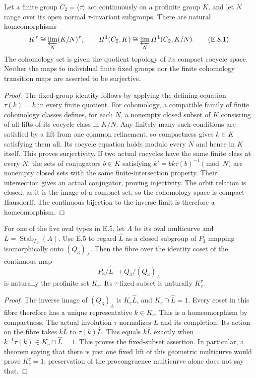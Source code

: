 Let a finite group $C_2=\langle\tau\rangle$ act continuously
on a profinite group $K$, and let $N$ range over its open
normal $\tau$-invariant subgroups.  There are natural
homeomorphisms
\[
 K^\tau\cong\varprojlim_N(K/N)^\tau,
 \qquad
 H^1(C_2,K)\cong\varprojlim_N H^1(C_2,K/N).                  \tag{E.8.1}
\]
The cohomology set is given the quotient topology of its
compact cocycle space.  Neither the maps to individual
finite fixed groups nor the finite cohomology transition
maps are asserted to be surjective.

\begin{proof}
The fixed-group identity follows by applying the defining
equation $\tau(k)=k$ in every finite quotient.  For
cohomology, a compatible family of finite cohomology
classes defines, for each $N$, a nonempty closed subset
of $K$ consisting of all lifts of its cocycle class in
$K/N$.  Any finitely many such conditions are satisfied
by a lift from one common refinement, so compactness
gives $k\in K$ satisfying them all.  Its cocycle equation
holds modulo every $N$ and hence in $K$ itself.  This
proves surjectivity.  If two actual cocycles have the same
finite class at every $N$, the sets of conjugators
$b\in K$ satisfying $k'=bk\tau(b)^{-1}\pmod N$ are
nonempty closed sets with the same finite-intersection
property.  Their intersection gives an actual
conjugator, proving injectivity.  The orbit relation
is closed, as it is the image of a compact set, so
the cohomology space is compact Hausdorff.  The continuous
bijection to the inverse limit is therefore a
homeomorphism.
\end{proof}

For one of the five oval types in E.5, let $A$ be its oval
multicurve and $L=\operatorname{Stab}_{\Gamma_3}(A)$.
Use E.5 to regard $\widehat L$ as a closed subgroup of
$P_3$ mapping isomorphically onto $(Q_3)_A$.  Then the
fibre over the identity coset of the continuous map
\[
 P_3/\widehat L\longrightarrow Q_3/(Q_3)_A
\]
is naturally the profinite set $K_c$.  Its $\tau$-fixed
subset is naturally $K_c^\tau$.

\begin{proof}
The inverse image of $(Q_3)_A$ is
$K_c\widehat L$, and $K_c\cap\widehat L=1$.  Every coset
in this fibre therefore has a unique representative
$k\in K_c$.  This is a homeomorphism by compactness.
The actual involution $\tau$ normalizes $L$ and its
completion.  Its action on the fibre takes $k\widehat L$
to $\tau(k)\widehat L$.  This equals $k\widehat L$
exactly when $k^{-1}\tau(k)\in K_c\cap\widehat L=1$.
This proves the fixed-subset assertion.  In particular,
a theorem saying that there is just one fixed lift of
this geometric multicurve would prove $K_c^\tau=1$;
preservation of the procongruence multicurve alone does
not say that.
\end{proof}

